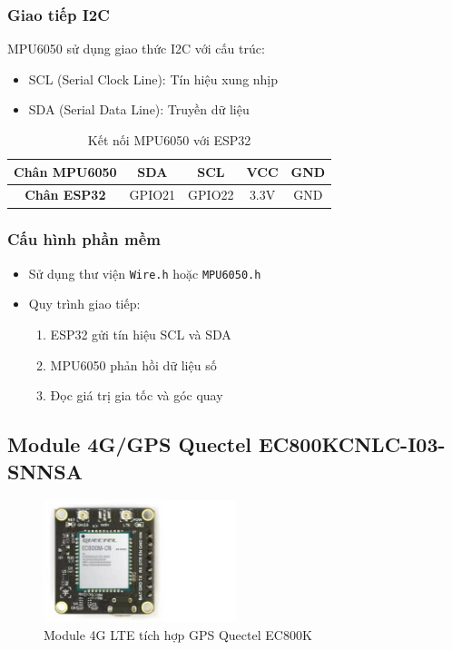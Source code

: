 \documentclass[a4paper,12pt]{report}
\begin{document}
	\subsubsection{Giao tiếp I2C}
	MPU6050 sử dụng giao thức I2C với cấu trúc:
	\begin{itemize}
		\item SCL (Serial Clock Line): Tín hiệu xung nhịp
		\item SDA (Serial Data Line): Truyền dữ liệu
	\end{itemize}
	
	\begin{table}[h]
		\centering
		\caption{Kết nối MPU6050 với ESP32}
		\label{tab:mpu6050_connection}
		\begin{tabular}{|c|c|c|c|c|}
			\hline
			\textbf{Chân MPU6050} & SDA & SCL & VCC & GND \\ \hline
			\textbf{Chân ESP32} & GPIO21 & GPIO22 & 3.3V & GND \\ \hline
		\end{tabular}
	\end{table}
	
	\subsubsection{Cấu hình phần mềm}
	\begin{itemize}
		\item Sử dụng thư viện \texttt{Wire.h} hoặc \texttt{MPU6050.h}
		\item Quy trình giao tiếp:
		\begin{enumerate}
			\item ESP32 gửi tín hiệu SCL và SDA
			\item MPU6050 phản hồi dữ liệu số
			\item Đọc giá trị gia tốc và góc quay
		\end{enumerate}
	\end{itemize}
	
	
	\subsection{Module 4G/GPS Quectel EC800KCNLC-I03-SNNSA}
	\begin{figure}[h]
		\centering
		\includegraphics[width=0.5\textwidth]{QUECTEL_EC800M_CN.png}
		\caption{Module 4G LTE tích hợp GPS Quectel EC800K}
		\label{fig:ec800k}
	\end{figure}
	
\end{document}
